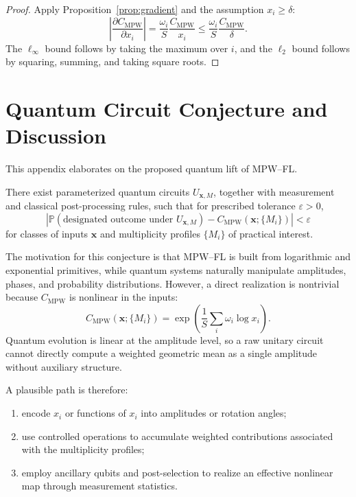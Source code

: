 \documentclass[11pt]{article}
\begin{document}
\begin{proof}
Apply Proposition~\ref{prop:gradient} and the assumption $x_i \ge \delta$:
\[
  \left|\frac{\partial C_{\mathrm{MPW}}}{\partial x_i}\right|
  = \frac{\omega_i}{S}\frac{C_{\mathrm{MPW}}}{x_i}
  \le \frac{\omega_i}{S}\frac{C_{\mathrm{MPW}}}{\delta}.
\]
The $\ell_\infty$ bound follows by taking the maximum over $i$, and the $\ell_2$ bound follows by squaring, summing, and taking square roots.
\end{proof}

\section{Quantum Circuit Conjecture and Discussion}
\label{app:quantum}

This appendix elaborates on the proposed quantum lift of MPW--FL.

\begin{conjecture}
\label{conj:appendix-quantum}
There exist parameterized quantum circuits $U_{\mathbf{x},M}$, together with measurement and classical post-processing rules, such that for prescribed tolerance $\varepsilon>0$,
\[
  \left|
  \mathbb{P}(\text{designated outcome under }U_{\mathbf{x},M})
  - C_{\mathrm{MPW}}(\mathbf{x};\{M_i\})
  \right|
  < \varepsilon
\]
for classes of inputs $\mathbf{x}$ and multiplicity profiles $\{M_i\}$ of practical interest.
\end{conjecture}

The motivation for this conjecture is that MPW--FL is built from logarithmic and exponential primitives, while quantum systems naturally manipulate amplitudes, phases, and probability distributions. However, a direct realization is nontrivial because $C_{\mathrm{MPW}}$ is nonlinear in the inputs:
\[
  C_{\mathrm{MPW}}(\mathbf{x};\{M_i\})
  = \exp\!\left(\frac{1}{S}\sum_i \omega_i \log x_i\right).
\]
Quantum evolution is linear at the amplitude level, so a raw unitary circuit cannot directly compute a weighted geometric mean as a single amplitude without auxiliary structure.

A plausible path is therefore:
\begin{enumerate}
  \item encode $x_i$ or functions of $x_i$ into amplitudes or rotation angles;
  \item use controlled operations to accumulate weighted contributions associated with the multiplicity profiles;
  \item employ ancillary qubits and post-selection to realize an effective nonlinear map through measurement statistics.
\end{enumerate}
\end{document}
